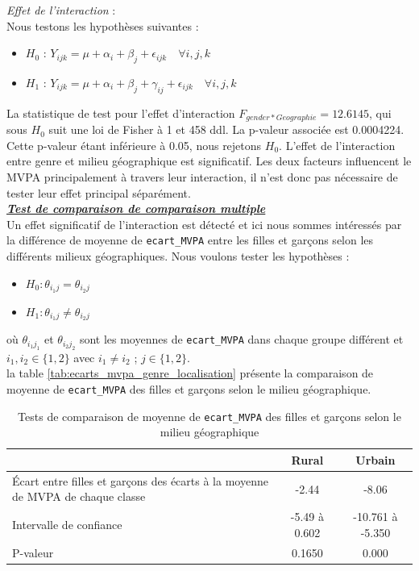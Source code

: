 \documentclass[12pt,a4paper]{article}
\begin{document}
\begin{enumerate}[label=\textbf{\alph*})]
	\noindent
	\textit{Effet de l'interaction} : \\
	Nous testons les hypothèses suivantes :
	\begin{itemize}[label=--, leftmargin=*]
		\item \textbf{$H_0$} : $Y_{ijk} = \mu + \alpha_i + \beta_j + \epsilon_{ijk} \quad \forall i,j,k$ 
		\item \textbf{$H_1$} : $Y_{ijk} = \mu + \alpha_i + \beta_j + \gamma_{ij} + \epsilon_{ijk} \quad \forall i,j,k$
	\end{itemize}
	La statistique de test pour l'effet d'interaction $F_{gender*Geographie} = 12.6145$, qui sous $H_0$ suit une loi de Fisher à 1 et 458 ddl. La p-valeur associée est 0.0004224. Cette p-valeur étant inférieure à 0.05, nous rejetons $H_0$. L'effet de l'interaction entre genre et milieu géographique est significatif. Les deux facteurs influencent le MVPA principalement à travers leur interaction, il n'est donc pas nécessaire de tester leur effet principal séparément.\\
	
	\noindent
	\textbf{\textit{\underline{Test de comparaison  de comparaison multiple}}} \\
	
	Un effet significatif de l'interaction est détecté et ici nous sommes intéressés par la différence de moyenne de \texttt{ecart\_MVPA} entre les filles et garçons selon les différents milieux géographiques. Nous voulons tester les hypothèses : 
	\begin{itemize}[label=--, leftmargin=*]
		\item $H_0 : \theta_{i_1j} = \theta_{i_2j}$
		\item $H_1 : \theta_{i_1j} \neq \theta_{i_2j}$
	\end{itemize}
	où $\theta_{i_1j_1}$ et $\theta_{i_2j_2}$ sont les moyennes de \texttt{ecart\_MVPA} dans chaque groupe différent et $i_1,i_2\in{\{1, 2\}} $ avec $ i_1 \neq i_2$ ; $j\in{\{1,2\}}$.\\
	la table \ref{tab:ecarts_mvpa_genre_localisation} présente la comparaison de moyenne de \texttt{ecart\_MVPA} des filles et garçons selon le milieu géographique.
	\begin{table}[H]
		\centering
		\caption{Tests de comparaison de moyenne de \texttt{ecart\_MVPA} des filles et garçons selon le milieu géographique}
		\begin{tabular}{|p{5cm}|c|c|}
			\hline
			& Rural & Urbain \\ 
			\hline
			Écart entre filles et garçons des écarts à la moyenne de MVPA de chaque classe & -2.44 & -8.06 \\ 
			\hline
			Intervalle de confiance & -5.49 à 0.602 & -10.761 à -5.350 \\ 
			\hline
			P-valeur & 0.1650 & 0.000 \\ 
			\hline
		\end{tabular}
		

\end{table}
\end{enumerate}
\end{document}
